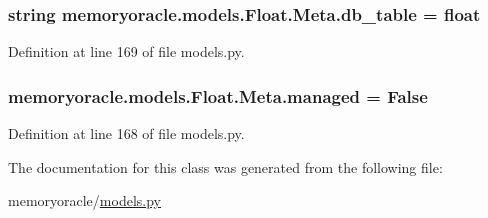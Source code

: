 \subsubsection[{db\+\_\+table}]{\setlength{\rightskip}{0pt plus 5cm}string memoryoracle.\+models.\+Float.\+Meta.\+db\+\_\+table = \textquotesingle{}float\textquotesingle{}\hspace{0.3cm}{\ttfamily [static]}}\label{classmemoryoracle_1_1models_1_1Float_1_1Meta_af2c7cc03305cab2473d128446b102a50}


Definition at line 169 of file models.\+py.

\hypertarget{classmemoryoracle_1_1models_1_1Float_1_1Meta_a1d52dd406f079bc52ac4caac33ee8ec0}{}
\subsubsection[{managed}]{\setlength{\rightskip}{0pt plus 5cm}memoryoracle.\+models.\+Float.\+Meta.\+managed = False\hspace{0.3cm}{\ttfamily [static]}}\label{classmemoryoracle_1_1models_1_1Float_1_1Meta_a1d52dd406f079bc52ac4caac33ee8ec0}


Definition at line 168 of file models.\+py.



The documentation for this class was generated from the following file\+:\begin{DoxyCompactItemize}
\item 
memoryoracle/\hyperlink{models_8py}{models.\+py}\end{DoxyCompactItemize}
